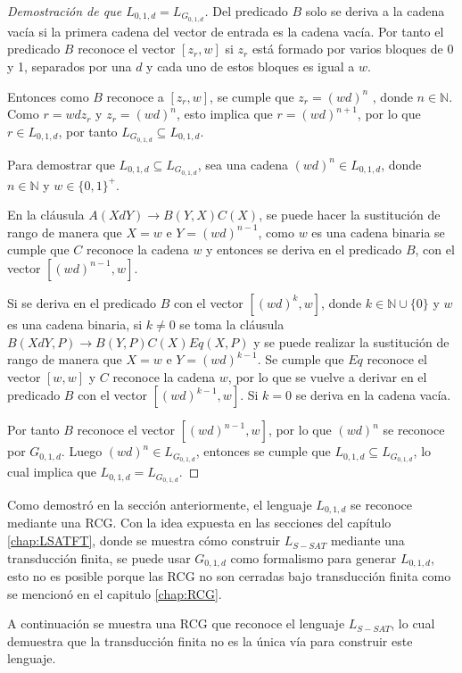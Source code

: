 \documentclass[12pt]{article}
\begin{document}
\begin{proof}[Demostración de que $L_{0,1,d}=L_{G_{0,1,d}}$]
    Del predicado $B$ solo se deriva a la cadena vacía si la primera cadena del vector de entrada es la cadena vacía. Por tanto el predicado $B$ reconoce el vector $[z_r,w]$ si $z_r$ está formado por varios bloques de 0 y 1, separados por una $d$ y cada uno de estos bloques es igual a $w$.
    
    Entonces como $B$ reconoce a $[z_r,w]$, se cumple que $z_r=(wd)^n$ , donde $n\in \mathbb{N}$. Como $r=wdz_r$ y $z_r=(wd)^n$, esto implica que $r=(wd)^{n+1}$, por lo que $r\in L_{0,1,d}$, por tanto $L_{G_{0,1,d}}\subseteq L_{0,1,d}$.
    
    Para demostrar que $L_{0,1,d}\subseteq L_{G_{0,1,d}}$, sea una cadena $(wd)^n\in L_{0,1,d}$, donde $n\in \mathbb{N}$ y $w \in \{0,1\}^+$.
    
    En la cláusula $A(XdY)\to B(Y,X)C(X)$, se puede hacer la sustitución de rango de manera que $X=w$ e $Y=(wd)^{n-1}$, como $w$ es una cadena binaria se cumple que $C$ reconoce la cadena $w$ y entonces se deriva en el predicado $B$, con el vector $[(wd)^{n-1},w]$.
    
    Si se deriva en el predicado $B$ con el vector $[(wd)^k,w]$, donde 
    $k\in \mathbb{N} \cup \{0\}$ y $w$ es una cadena binaria, si $k\neq 0$ se toma la cláusula
    $B(XdY,P)\to B(Y,P) C(X) Eq(X,P)$ y se puede realizar la sustitución de rango de manera que
    $X=w$ e $Y=(wd)^{k-1}$. Se cumple que $Eq$ reconoce el vector $[w,w]$ y $C$ reconoce la cadena $w$,
    por lo que se vuelve a derivar en el  predicado $B$ con el vector $[(wd)^{k-1},w]$. Si $k=0$ se deriva
    en la cadena vacía.
    
    Por tanto $B$ reconoce el vector $[(wd)^{n-1},w]$, por lo que $(wd)^n$ se reconoce por $G_{0,1,d}$. Luego
    $(wd)^n\in L_{G_{0,1,d}}$, entonces se cumple que $L_{0,1,d}\subseteq L_{G_{0,1,d}}$, lo cual implica
    que $L_{0,1,d} = L_{G_{0,1,d}}$.
\end{proof}

Como demostró en la sección anteriormente, el lenguaje $L_{0,1,d}$ se reconoce mediante una RCG.  Con la idea expuesta en las secciones del capítulo \ref{chap:LSATFT}, donde se muestra cómo construir $L_{S-SAT}$ mediante una transducción finita, se puede usar $G_{0,1,d}$ como formalismo para generar $L_{0,1,d}$, esto no es posible porque las RCG no son cerradas bajo transducción finita como se mencionó en el capitulo \ref{chap:RCG}.

A continuación se muestra una RCG que reconoce el lenguaje $L_{S-SAT}$, lo cual demuestra que la transducción finita no es la única vía para construir este lenguaje.
\end{document}
